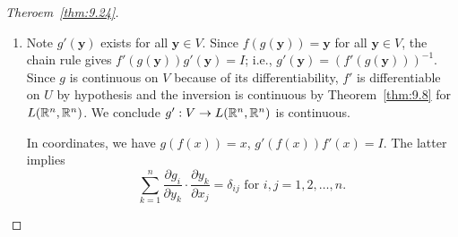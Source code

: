 \begin{proof}[Theroem~\ref{thm:9.24}]
\begin{enumerate}
\begin{description}
\begin{claim}
\[					            .\]
				            I.e.,
				            \[
					            \left|\mathbf{x_k-x}\right|\le  2 \|A^{-1}\| \left|k\right|.
				            \]
			            \end{claim}
			            \begin{proof}
				            $\mathbf{x_k-x}=\phi_{\mathbf{y}}(\mathbf{x_k})-\phi_{\mathbf{y}}(\mathbf{x})+A^{-1}k$, so
				            \[
					            \left|x_k-x\right|\le  \left|\phi_y(x_k)-\phi_y(x)\right|+\|A^{-1}\left|k\right|\|\le \frac{1}{2} \left|x_k-x\right|+\|A^{-1}\left|k\right|\| \le 2 \|A^{-1}\| \left|k\right|
					            .\]
			            \end{proof}
			            Since we have
			            \[
				            \frac{\left|g(\mathbf{y+k})-g(\mathbf{y})-Tk\right|}{\left|k\right|}\le 2 \|A^{-1}\| \cdot \|T\| \cdot  \frac{\left|f(\mathbf{x_k})-f(\mathbf{x})-S(\mathbf{x_k-x})\right|}{\left|\mathbf{x_k-x}\right|}
				            ,\]
			            as $k\to 0$, by the claim, $\left|\mathbf{x_k}-\mathbf{x}\right|\to 0$, so the right hand side of the inequality goes to $0$ as $k\to 0$ by definition of $S=f'(\mathbf{x})$.
			            This shows that $g'(\mathbf{y})=T$ exists for all $\mathbf{y} \in V=f(U)$.
			            $f:U\to V=(U)$.
		      \end{description}
		\item
		      Note $g'(\mathbf{y})$ exists for all $\mathbf{y}\in V$.
		      Since $f(g(\mathbf{y}))=\mathbf{y}$ for all $\mathbf{y} \in V$, the chain rule gives $f'(g(\mathbf{y}))g'(\mathbf{y})=I$; i.e., $g'(\mathbf{y})=(f'(g(\mathbf{y})))^{-1}$.
		      Since $g$ is continuous on $V$ because of its differentiability, $f'$ is differentiable on $U$ by hypothesis and the inversion is continuous by Theorem~\ref{thm:9.8} for $L(\mathbb{R}^{n}, \mathbb{R}^{n})$.
		      We conclude $g':V\to L(\mathbb{R}^{n},\mathbb{R}^{n})$ is continuous.
		      \begin{note}
			      In coordinates, we have $g(f(x))=x$, $g'(f(x))f'(x)=I$.
			      The latter implies \[
				      \sum_{k=1}^{n}\frac{\partial{g_i}}{\partial{y_k}}\cdot \frac{\partial{y_k}}{\partial{x_j}}= \delta_{ij} \text{ for } i,j=1,2,\ldots,n.\]
		      \end{note}
	\end{enumerate}
\end{proof}


